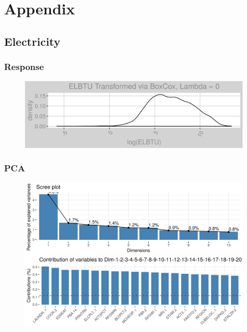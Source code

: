 \section*{Appendix}
\label{sec:appendix}

\appendix
\subsection{Electricity}
\subsubsection{Response}
\label{appendix:electricity:response}
\begin{figure}[h]
\centering
\includegraphics[width=\textwidth, height=0.2\textheight]{Images/electricity_response.png}
\end{figure}
\subsubsection{PCA}
\label{appendix:electricity:pca}
\begin{figure}[h]
\centering
\includegraphics[width=\textwidth, height=0.5\textheight]{Images/electricity_pca_vars.png}
\end{figure}
\newpage
